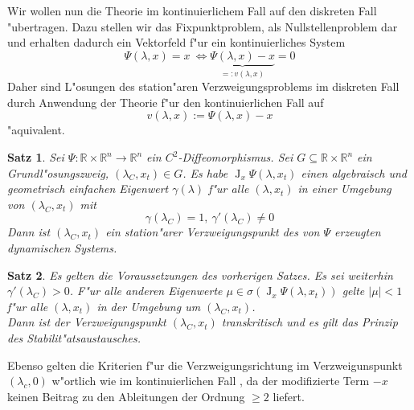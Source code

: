 \documentclass[a4paper, 13pt]{scrreprt}
\newtheorem{satz}{Satz}[section]
\theoremstyle{definition} \newtheorem{definition}{Definition}[section]
\newcommand{\RR}{\mathbb{R}}
\begin{document}
Wir wollen nun die Theorie im kontinuierlichem Fall auf den diskreten Fall "ubertragen. Dazu stellen wir das Fixpunktproblem, als Nullstellenproblem dar und erhalten dadurch ein Vektorfeld f"ur ein kontinuierliches System
\[\Psi(\lambda,x)=x \ \Leftrightarrow \underbrace{\Psi(\lambda,x)-x}_{=:v(\lambda,x)}=0\]
Daher sind L"osungen des station"aren Verzweigungsproblems im diskreten Fall durch Anwendung der Theorie f"ur den kontinuierlichen Fall auf 
\[v(\lambda,x):=\Psi(\lambda,x)-x\]
"aquivalent.

\begin{satz}
Sei $\Psi\colon\RR\times\RR^n\to\RR^n$ ein $C^2$-Diffeomorphismus. Sei $G\subseteq \RR\times\RR^n$ ein Grundl"osungszweig, $(\lambda_C, x_t)\in G$. Es habe $\operatorname{J}_x \Psi(\lambda, x_t)$ einen algebraisch und geometrisch einfachen Eigenwert $\gamma(\lambda)$ f"ur alle $(\lambda, x_t)$ in einer Umgebung von $(\lambda_C, x_t)$ mit
$$ \gamma(\lambda_C) = 1 , \  \gamma'(\lambda_C) \neq 0$$
Dann ist $(\lambda_C, x_t)$ ein station"arer Verzweigungspunkt des von $\Psi$ erzeugten dynamischen Systems.
\end{satz}

\begin{satz}
Es gelten die Voraussetzungen des vorherigen Satzes. Es sei weiterhin $\gamma'(\lambda_C) > 0$. F"ur alle \emph{anderen} Eigenwerte $\mu \in \sigma(\operatorname{J}_x \Psi(\lambda, x_t))$ gelte $|\mu|< 1$ f"ur alle $(\lambda, x_t)$ in der Umgebung um $(\lambda_C, x_t)$.\\
Dann ist der Verzweigungspunkt $(\lambda_C, x_t)$ transkritisch und es gilt das \emph{Prinzip des Stabilit"atsaustausches}.
\end{satz}

Ebenso gelten die Kriterien f"ur die Verzweigungsrichtung im Verzweigunspunkt $(\lambda_c,0)$ w"ortlich wie im kontinuierlichen Fall , da der modifizierte Term $-x$ keinen Beitrag zu den Ableitungen der Ordnung $\geq 2$ liefert.
\end{document}
